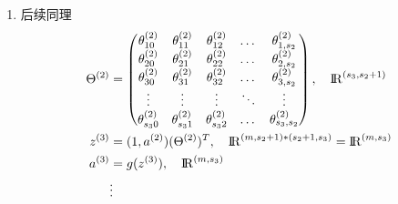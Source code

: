 \begin{enumerate}
\item 后续同理 \\
\begin{equation}\begin{aligned}
	\Theta^{(2)} &= 
		\left(\begin{matrix}
			\theta_{10}^{(2)} & \theta_{11}^{(2)} & \theta_{12}^{(2)} & \dots & \theta_{1,s_2}^{(2)} \\
			\theta_{20}^{(2)} & \theta_{21}^{(2)} & \theta_{22}^{(2)} & \dots & \theta_{2,s_2}^{(2)} \\
			\theta_{30}^{(2)} & \theta_{31}^{(2)} & \theta_{32}^{(2)} & \dots & \theta_{3,s_2}^{(2)} \\
			\vdots    & \vdots    & \vdots    & \ddots & \vdots   \\
			\theta_{s_{3}0}^{(2)} & \theta_{s_{3}1}^{(2)} & \theta_{s_{3}2}^{(2)} & \dots & \theta_{s_{3},s_{2}}^{(2)}
		\end{matrix}\right), \quad {\rm I\!R}^{(s_{3},s_2+1)}\\
	z^{(3)} &= (1, a^{(2)}) (\Theta^{(2)})^T, \quad {\rm I\!R}^{(m,s_2+1) * (s_2+1, s_3)}={\rm I\!R}^{(m,s_3)} \\
	a^{(3)} &= g(z^{(3)}), \quad {\rm I\!R}^{(m,s_3)} \\
	& \vdots \\
\end{aligned} \end{equation}


\end{enumerate}
